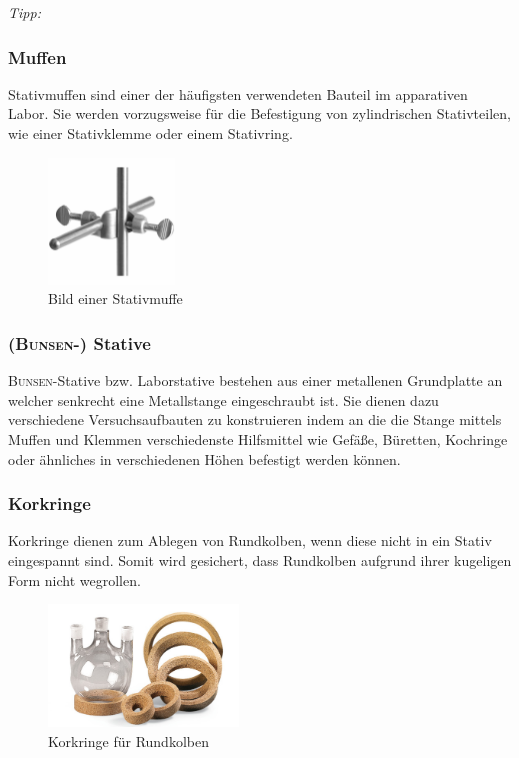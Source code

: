 \textit{Tipp:}\\
\vspace*{-5mm}


\newpage

\subsubsection*{Muffen}
Stativmuffen sind einer der häufigsten verwendeten Bauteil im apparativen Labor. Sie werden vorzugsweise für die Befestigung von zylindrischen Stativteilen, wie einer Stativklemme oder einem Stativring.
\vspace*{-5mm}
\begin{figure}[h!]
	\centering
	\includegraphics[width=0.3\textwidth]{img/muffe}
	\caption{Bild einer Stativmuffe}
	\label{fig:muffe}
\end{figure}
\FloatBarrier
\vspace*{-2mm}
\subsubsection*{(\textsc{Bunsen}-) Stative}
\textsc{Bunsen}-Stative bzw. Laborstative bestehen aus einer metallenen Grundplatte an welcher senkrecht eine Metallstange eingeschraubt ist. Sie dienen dazu verschiedene Versuchsaufbauten zu konstruieren indem an die die Stange mittels Muffen und Klemmen verschiedenste Hilfsmittel wie Gefäße, Büretten, Kochringe oder ähnliches in verschiedenen Höhen befestigt werden können.

\subsubsection*{Korkringe}
Korkringe dienen zum Ablegen von Rundkolben, wenn diese nicht in ein Stativ eingespannt sind. Somit wird gesichert, dass Rundkolben aufgrund ihrer kugeligen Form nicht wegrollen.
\begin{figure}[h!]
	\centering
	\includegraphics[width=0.45\textwidth]{img/korkring}
	\caption{Korkringe für Rundkolben}
	\label{fig:korkring}
\end{figure}
\FloatBarrier

